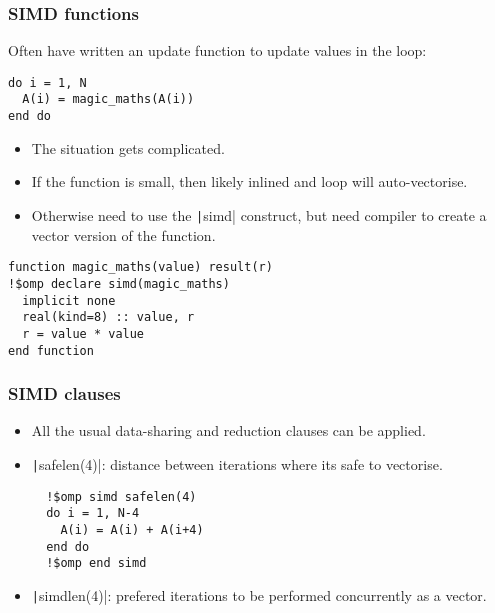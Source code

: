 \documentclass{beamer}
\begin{document}
\begin{frame}[fragile]
\frametitle{SIMD functions}
Often have written an update function to update values in the loop:
\begin{verbatim}
do i = 1, N
  A(i) = magic_maths(A(i))
end do
\end{verbatim}

\begin{itemize}
  \item The situation gets complicated.
  \item If the function is small, then likely inlined and loop will auto-vectorise.
  \item Otherwise need to use the \texttt|simd| construct, but need compiler to create a vector version of the function.
\end{itemize}

\begin{verbatim}
function magic_maths(value) result(r)
!$omp declare simd(magic_maths)
  implicit none
  real(kind=8) :: value, r
  r = value * value
end function
\end{verbatim}

\end{frame}

\begin{frame}[fragile]
\frametitle{SIMD clauses}
\begin{itemize}
  \item All the usual data-sharing and reduction clauses can be applied.
  \item \texttt|safelen(4)|: distance between iterations where its safe to vectorise.
  \begin{verbatim}
  !$omp simd safelen(4)
  do i = 1, N-4
    A(i) = A(i) + A(i+4)
  end do
  !$omp end simd
  \end{verbatim}
  \item \texttt|simdlen(4)|: prefered iterations to be performed concurrently as a vector.
\end{itemize}
\end{frame}
\end{document}
